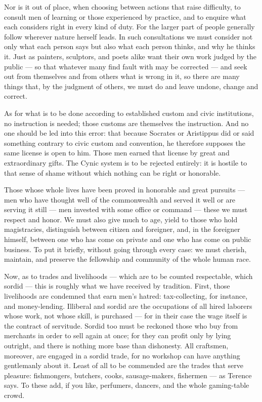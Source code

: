  Nor is it out of place, when choosing between actions that raise difficulty, to consult men of learning or those experienced by practice, and to enquire what each considers right in every kind of duty. For the larger part of people generally follow wherever nature herself leads. In such consultations we must consider not only what each person says but also what each person thinks, and why he thinks it. Just as painters, sculptors, and poets alike want their own work judged by the public — so that whatever many find fault with may be corrected — and seek out from themselves and from others what is wrong in it, so there are many things that, by the judgment of others, we must do and leave undone, change and correct.

 As for what is to be done according to established custom and civic institutions, no instruction is needed; those customs are themselves the instruction. And no one should be led into this error: that because Socrates or Aristippus did or said something contrary to civic custom and convention, he therefore supposes the same license is open to him. Those men earned that license by great and extraordinary gifts. The Cynic system is to be rejected entirely: it is hostile to that sense of shame without which nothing can be right or honorable.

 Those whose whole lives have been proved in honorable and great pursuits — men who have thought well of the commonwealth and served it well or are serving it still — men invested with some office or command — these we must respect and honor. We must also give much to age, yield to those who hold magistracies, distinguish between citizen and foreigner, and, in the foreigner himself, between one who has come on private and one who has come on public business. To put it briefly, without going through every case: we must cherish, maintain, and preserve the fellowship and community of the whole human race.

 Now, as to trades and livelihoods — which are to be counted respectable, which sordid — this is roughly what we have received by tradition. First, those livelihoods are condemned that earn men's hatred: tax-collecting, for instance, and money-lending. Illiberal and sordid are the occupations of all hired laborers whose work, not whose skill, is purchased — for in their case the wage itself is the contract of servitude. Sordid too must be reckoned those who buy from merchants in order to sell again at once; for they can profit only by lying outright, and there is nothing more base than dishonesty. All craftsmen, moreover, are engaged in a sordid trade, for no workshop can have anything gentlemanly about it. Least of all to be commended are the trades that serve pleasure: fishmongers, butchers, cooks, sausage-makers, fishermen — as Terence says. To these add, if you like, perfumers, dancers, and the whole gaming-table crowd.

